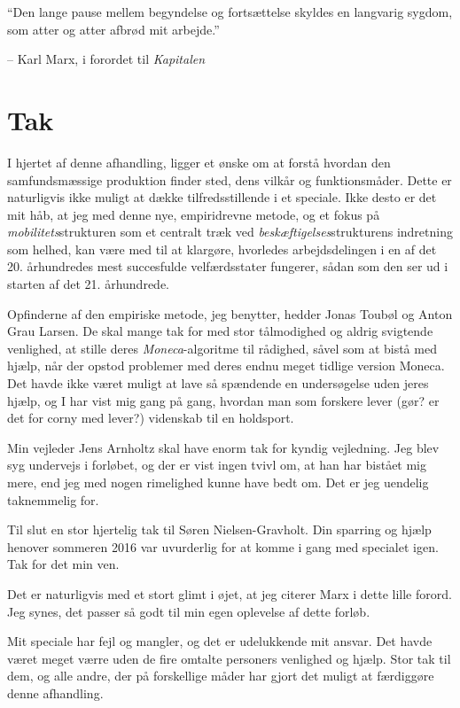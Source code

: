 
\vspace{20pt} \epigraphfontsize{\small\itshape}
\epigraphfontsize{\small\itshape}
\epigraph{“Den lange pause mellem begyndelse og fortsættelse skyldes en langvarig sygdom, som atter og atter afbrød mit arbejde.”}{-- \textup{Karl Marx, i forordet til \emph{Kapitalen}}}

\section{Tak \label{Tak}}



I hjertet af denne afhandling, ligger et ønske om at forstå hvordan den samfundsmæssige produktion finder sted, dens vilkår og funktionsmåder.  Dette er naturligvis ikke muligt at dække tilfredsstillende i et speciale. Ikke desto er det mit håb, at jeg med denne nye, empiridrevne metode, og et fokus på \emph{mobilitets}strukturen som et centralt træk ved  \emph{beskæftigelses}strukturens indretning som helhed,  kan være med til at klargøre, hvorledes arbejdsdelingen i en af det 20. århundredes mest succesfulde velfærdsstater fungerer, sådan som den ser ud i starten af det 21. århundrede. 


Opfinderne af den empiriske metode, jeg benytter, hedder Jonas Toubøl og Anton Grau Larsen. De skal mange tak for med stor tålmodighed og aldrig svigtende venlighed, at stille deres \emph{Moneca}-algoritme til rådighed, såvel som at bistå med hjælp, når der opstod  problemer med deres endnu meget tidlige version Moneca. Det havde ikke været muligt at lave så spændende en undersøgelse uden jeres hjælp, og I har vist mig gang på gang, hvordan man som forskere lever (gør? er det for corny med lever?) videnskab til en holdsport.  

Min vejleder Jens Arnholtz skal have enorm tak for kyndig vejledning. Jeg blev syg undervejs i forløbet, og der er vist ingen tvivl om, at han har bistået mig mere, end jeg med nogen rimelighed kunne have bedt om. Det er jeg uendelig taknemmelig for. 

Til slut en stor hjertelig tak til Søren Nielsen-Gravholt. Din sparring og hjælp henover sommeren 2016 var uvurderlig for at komme i gang med specialet igen. Tak for det min ven. 

Det er naturligvis med et stort glimt i øjet, at jeg citerer Marx i dette lille forord. Jeg synes, det passer så godt til min egen oplevelse af dette forløb. 

Mit speciale har fejl og mangler, og det er udelukkende mit ansvar. Det havde været meget værre uden de fire omtalte personers venlighed og hjælp. Stor tak til dem, og alle andre, der på forskellige måder har gjort det muligt at færdiggøre denne afhandling.  




